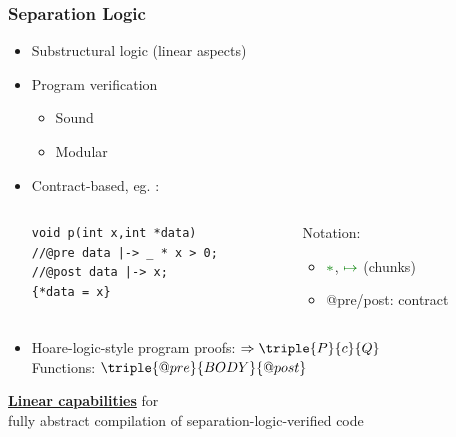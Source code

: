 \documentclass{beamer}
\begin{document}
\begin{frame}[fragile]
\frametitle{Separation Logic} 
\begin{itemize}
\item Substructural logic (linear aspects)
\item Program verification
\begin{itemize}
\item Sound %
\item Modular %
\end{itemize}
\item Contract-based, eg. :\\
\begin{columns}%
\begin{column}{0.55\textwidth}
\begin{lstlisting}[style=CStylenoNum, captionpos = t, xleftmargin = 4em]
void p(int x,int *data)
//@pre data |-> _ * x > 0;
//@post data |-> x;
{*data = x}
\end{lstlisting}
\end{column}
\begin{column}{0.45\textwidth}
Notation:
\begin{itemize}
\item $\textcolor{mGreen}{\ast}$, $\textcolor{mGreen}{\mapsto}$ (chunks)
\item @pre/post: contract
\end{itemize}
\end{column}
\end{columns}
\item Hoare-logic-style program proofs: $\Rightarrow \triple{P}{c}{Q}$\\
	\quad Functions: $\triple{@pre}{BODY}{@post}$
\end{itemize}
\end{frame}

\begin{frame}[plain,c]

\begin{center}
\Huge \underline{\textbf{Linear capabilities}} for\\  fully abstract
compilation of separation-logic-verified code
\end{center}

\end{frame}


\end{document}
